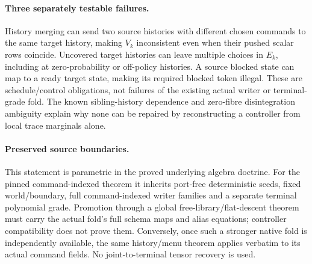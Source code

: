 \documentclass[11pt]{article}
\begin{document}
\paragraph{Three separately testable failures.}
History merging can send two source histories with different chosen commands to the same target history, making $V_k$ inconsistent even when their pushed scalar rows coincide. Uncovered target histories can leave multiple choices in $E_k$, including at zero-probability or off-policy histories. A source blocked state can map to a ready target state, making its required blocked token illegal. These are schedule/control obligations, not failures of the existing actual writer or terminal-grade fold. The known sibling-history dependence and zero-fibre disintegration ambiguity explain why none can be repaired by reconstructing a controller from local trace marginals alone.

\paragraph{Preserved source boundaries.}
This statement is parametric in the proved underlying algebra doctrine. For the pinned command-indexed theorem it inherits port-free deterministic seeds, fixed world/boundary, full command-indexed writer families and a separate terminal polynomial grade. Promotion through a global free-library/flat-descent theorem must carry the actual fold's full schema maps and alias equations; controller compatibility does not prove them. Conversely, once such a stronger native fold is independently available, the same history/menu theorem applies verbatim to its actual command fields. No joint-to-terminal tensor recovery is used.
\end{document}
